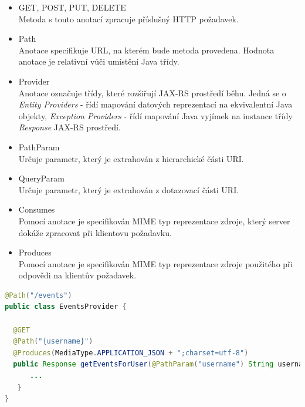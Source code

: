 \documentclass{diplomka}
\begin{document}
\begin{itemize}[noitemsep,nolistsep]
\item GET, POST, PUT, DELETE\\
Metoda s touto anotací zpracuje příslušný HTTP požadavek.
\item Path\\
Anotace specifikuje URL, na kterém bude metoda provedena. Hodnota anotace je relativní vůči umístění Java třídy. 
\item Provider\\
Anotace označuje třídy, které rozšiřují JAX-RS prostředí běhu. Jedná se o \emph{Entity Providers} - řídí mapování datových reprezentací na ekvivalentní Java objekty, \emph{Exception Providers} - řídí mapování Java vyjímek na instance třídy \emph{ Response} JAX-RS prostředí.
\item PathParam\\
Určuje parametr, který je extrahován z hierarchické části URI.
\item QueryParam\\
Určuje parametr, který je extrahován z dotazovací části URI.
\item Consumes\\
Pomocí anotace je specifikován MIME typ reprezentace zdroje, který server dokáže zpracovat při klientovu požadavku.
\item Produces\\
Pomocí anotace je specifikován MIME typ reprezentace zdroje použitého při odpovědi na klientův požadavek.
\end{itemize}


\begin{lstlisting}[language=Java, caption={Ukázka použití},]
@Path("/events")
public class EventsProvider {

  @GET
  @Path("{username}")
  @Produces(MediaType.APPLICATION_JSON + ";charset=utf-8")
  public Response getEventsForUser(@PathParam("username") String username, @QueryParam("from") String from, @QueryParam("to") String to) throws Exception {
      ...
   }
}
\end{lstlisting}
\end{document}
